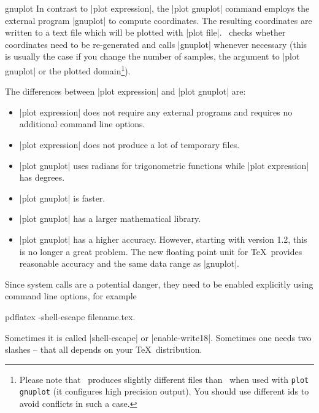 \begin{addplotoperation}[]{gnuplot}{}
In contrast to |plot expression|, the |plot gnuplot| command employs the external program |gnuplot| to compute coordinates. The resulting coordinates are written to a text file which will be plotted with |plot file|. \PGF\ checks whether coordinates need to be re-generated and calls |gnuplot| whenever necessary (this is usually the case if you change the number of samples, the argument to |plot gnuplot| or the plotted domain\footnote{Please note that \PGFPlots\ produces slightly different files than \Tikz\ when used with \texttt{plot gnuplot} (it configures high precision output). You should use different ids to avoid conflicts in such a case.}).

The differences between |plot expression| and |plot gnuplot| are:
\begin{itemize}
	\item |plot expression| does not require any external programs and requires no additional command line options.
	\item |plot expression| does not produce a lot of temporary files.
	\item |plot gnuplot| uses radians for trigonometric functions while |plot expression| has degrees.
	\item |plot gnuplot| is faster.
	\item |plot gnuplot| has a larger mathematical library.
	\item |plot gnuplot| has a higher accuracy. However, starting with version 1.2, this is no longer a great problem. The new floating point unit for \TeX\ provides reasonable accuracy and the same data range as |gnuplot|.
\end{itemize}

Since system calls are a potential danger, they need to be enabled explicitly using command line options, for example
\begin{codeexample}
pdflatex -shell-escape filename.tex.
\end{codeexample}
Sometimes it is called |shell-escape| or |enable-write18|. Sometimes one needs two slashes -- that all depends on your \TeX\ distribution.
\begin{codeexample}[]
\end{codeexample}


\end{addplotoperation}
